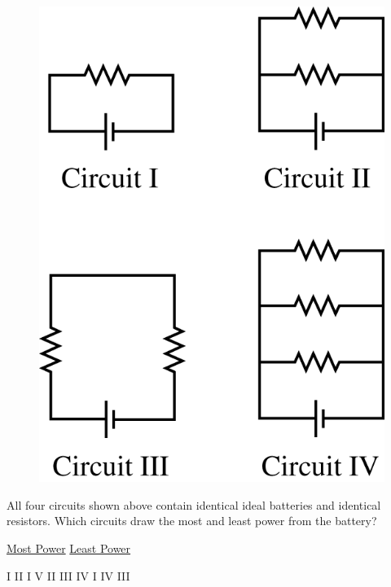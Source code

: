 \begin{figure}[H]
    \centering
    \includegraphics[scale=0.3]{images/img-007-011.png}
\end{figure}

\begin{questions}\setcounter{question}{15}\question
All four circuits shown above contain identical ideal batteries and identical resistors. Which circuits draw the most and least power from the battery?

\tabto{0.75cm}\underline{Most Power}
\tabto{4.00cm}\underline{Least Power}

\begin{choices}
\choice I  \tabto{3.25cm} II
\choice I  \tabto{3.25cm} V
\choice II \tabto{3.25cm} III
\choice IV \tabto{3.25cm} I
\choice IV \tabto{3.25cm} III
\end{choices}\end{questions}

